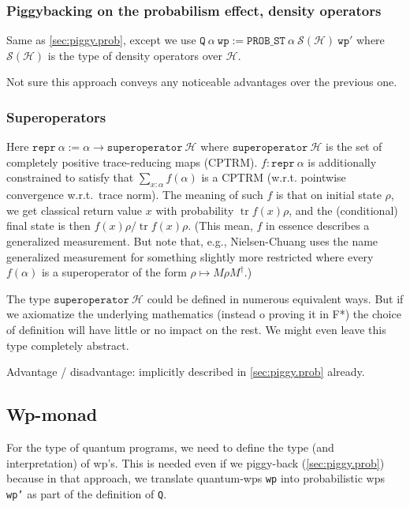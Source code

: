 \documentclass[a4paper]{article}
\newcommand\calH{\mathcal H}
\newcommand\density{\mathcal S(\calH)}
\DeclareMathOperator\tr{tr}
\begin{document}
\subsubsection{Piggybacking on the probabilism effect, density operators}

Same as \autoref{sec:piggy.prob}, except we use 
$\mathtt{Q}\ \alpha\ \mathtt{wp} := \mathtt{PROB\_ST}\ \alpha\ \density\
\mathtt{wp'}$ where $\density$ is the type of density operators over $\calH$.

Not sure this approach conveys any noticeable advantages over the previous one.

\subsubsection{Superoperators}
\label{sec:superop}

Here $\mathtt{repr}\ \alpha := \alpha\to\mathtt{superoperator}\ \calH$
where $\mathtt{superoperator}\ \calH$ is the set of completely
positive trace-reducing maps (CPTRM).
$f:\mathtt{repr}\ \alpha$ is additionally constrained to satisfy that $\sum_{x:\alpha} f(\alpha)$ is a CPTRM (w.r.t. pointwise convergence w.r.t.~trace norm).
The meaning of such $f$ is that on initial state $\rho$, we get classical return value $x$ with probability $\tr f(x)\rho$, and the (conditional) final state is then $f(x)\rho/\tr f(x)\rho$.
(This mean, $f$ in essence describes a generalized measurement. But note that, e.g., Nielsen-Chuang uses the name generalized measurement for something slightly more restricted where every $f(\alpha)$ is a superoperator of the form $\rho\mapsto M\rho M^\dagger$.)

The type $\mathtt{superoperator}\ \calH$ could be defined in numerous
equivalent ways. But if we axiomatize the underlying mathematics
(instead o proving it in F*) the choice of definition will have little
or no impact on the rest. We might even leave this type completely
abstract.

Advantage / disadvantage: implicitly described in
\autoref{sec:piggy.prob} already.

\subsection{Wp-monad}

For the type of quantum programs, we need to define the type (and
interpretation) of wp's. This is needed even if we piggy-back
(\autoref{sec:piggy.prob}) because in that approach, we translate
quantum-wps \texttt{wp} into probabilistic wps \texttt{wp'} as part of
the definition of \texttt{Q}.
\end{document}
